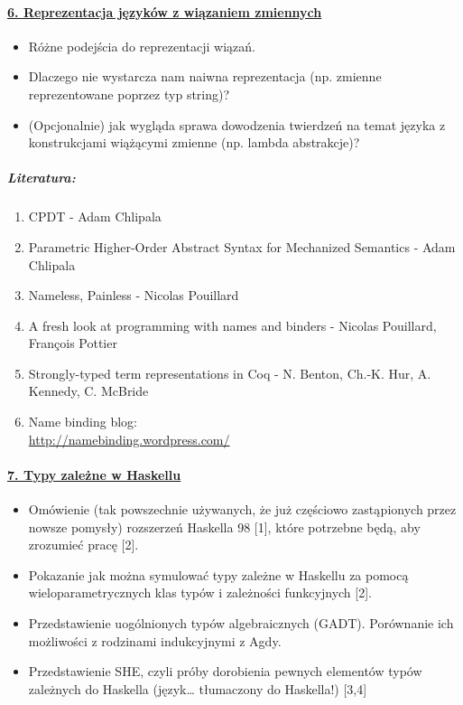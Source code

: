 \documentclass[10pt, a4paper]{article}
\begin{document}
\paragraph{\underline{6. Reprezentacja języków z wiązaniem zmiennych}}

\begin{itemize}
\addtolength{\itemsep}{-0.5\baselineskip}
 \item Różne podejścia do reprezentacji wiązań. 
 \item Dlaczego nie wystarcza nam naiwna reprezentacja (np. zmienne reprezentowane poprzez typ string)? 
 \item (Opcjonalnie) jak wygląda sprawa dowodzenia twierdzeń na temat języka z konstrukcjami wiążącymi zmienne (np. lambda abstrakcje)?
\end{itemize}

\subparagraph{Literatura:}

\begin{enumerate}
\addtolength{\itemsep}{-0.5\baselineskip}
 \item CPDT - Adam Chlipala
 \item Parametric Higher-Order Abstract Syntax for Mechanized Semantics - Adam Chlipala
 \item Nameless, Painless - Nicolas Pouillard
 \item A fresh look at programming with names and binders - Nicolas Pouillard, François Pottier
 \item Strongly-typed term representations in Coq - N. Benton, Ch.-K. Hur, A. Kennedy, C. McBride
 \item Name binding blog: \\
       \url{http://namebinding.wordpress.com/}
\end{enumerate}

\paragraph{\underline{7. Typy zależne w Haskellu}}

\begin{itemize}
\addtolength{\itemsep}{-0.5\baselineskip}
 \item Omówienie (tak powszechnie używanych, że już częściowo zastąpionych przez nowsze pomysły) rozszerzeń Haskella 98 [1], które potrzebne będą, aby zrozumieć pracę [2].
 \item Pokazanie jak można symulować typy zależne w Haskellu za pomocą wieloparametrycznych klas typów i zależności funkcyjnych [2].
 \item Przedstawienie uogólnionych typów algebraicznych (GADT). Porównanie ich możliwości z rodzinami indukcyjnymi z Agdy.
 \item Przedstawienie SHE, czyli próby dorobienia pewnych elementów typów zależnych do Haskella (język… tłumaczony do Haskella!) [3,4]
\end{itemize}
\end{document}
